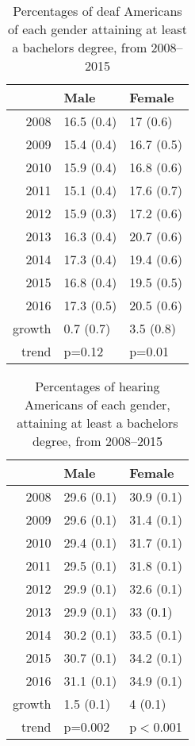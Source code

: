 \documentclass{article}\usepackage[]{graphicx}\usepackage[]{color}
\begin{document}
\begin{table}[ht]
\centering
\begin{tabular}{rll}
  \hline
 & Male & Female \\
  \hline
2008 & 16.5 (0.4) & 17 (0.6) \\
  2009 & 15.4 (0.4) & 16.7 (0.5) \\
  2010 & 15.9 (0.4) & 16.8 (0.6) \\
  2011 & 15.1 (0.4) & 17.6 (0.7) \\
  2012 & 15.9 (0.3) & 17.2 (0.6) \\
  2013 & 16.3 (0.4) & 20.7 (0.6) \\
  2014 & 17.3 (0.4) & 19.4 (0.6) \\
  2015 & 16.8 (0.4) & 19.5 (0.5) \\
  2016 & 17.3 (0.5) & 20.5 (0.6) \\
  growth & 0.7 (0.7)  & 3.5 (0.8)  \\
  trend & p=0.12 & p=0.01 \\
   \hline
\end{tabular}
\caption{Percentages of deaf Americans of each gender attaining at least a bachelors degree, from 2008--2015}
\end{table}
\begin{table}[ht]
\centering
\begin{tabular}{rll}
  \hline
 & Male & Female \\
  \hline
2008 & 29.6 (0.1) & 30.9 (0.1) \\
  2009 & 29.6 (0.1) & 31.4 (0.1) \\
  2010 & 29.4 (0.1) & 31.7 (0.1) \\
  2011 & 29.5 (0.1) & 31.8 (0.1) \\
  2012 & 29.9 (0.1) & 32.6 (0.1) \\
  2013 & 29.9 (0.1) & 33 (0.1) \\
  2014 & 30.2 (0.1) & 33.5 (0.1) \\
  2015 & 30.7 (0.1) & 34.2 (0.1) \\
  2016 & 31.1 (0.1) & 34.9 (0.1) \\
  growth & 1.5 (0.1)  & 4 (0.1)  \\
  trend & p=0.002 & p$<$0.001 \\
   \hline
\end{tabular}
\caption{Percentages of hearing Americans of each gender, attaining at least a bachelors degree, from 2008--2015}
\end{table}
\end{document}
